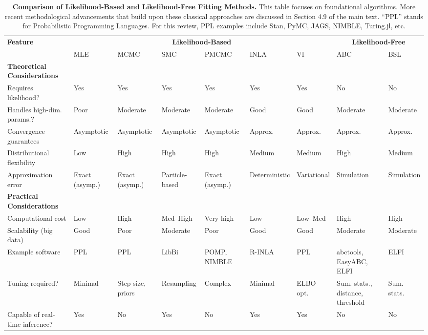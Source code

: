 \documentclass{article}
\begin{document}
\begin{landscape}
\begin{table}[ht]
\renewcommand{\arraystretch}{1.2}
\centering
\caption{\textbf{Comparison of Likelihood-Based and Likelihood-Free Fitting Methods.} 
This table focuses on foundational algorithms. More recent methodological advancements that build upon these classical approaches are discussed in Section 4.9 of the main text. ``PPL'' stands for Probabilistic Programming Languages. For this review, PPL examples include Stan, PyMC, JAGS, NIMBLE, Turing.jl, etc.}
\label{tab:methods_comparison}
\small
\begin{tabular}{@{}p{3.5cm}p{1.5cm}p{1.5cm}p{1.5cm}p{1.5cm}p{1.5cm}p{1.5cm}p{1.5cm}p{1.5cm}@{}}
\toprule
\multirow{2}{*}{\textbf{Feature}} & \multicolumn{6}{c}{\textbf{Likelihood-Based}} & \multicolumn{2}{c}{\textbf{Likelihood-Free}} \\
\cmidrule(lr){2-7} \cmidrule(lr){8-9}
 & MLE & MCMC & SMC & PMCMC & INLA & VI & ABC & BSL \\
\midrule
\textbf{Theoretical Considerations} & & & & & & & & \\
\midrule
Requires likelihood? & Yes & Yes & Yes & Yes & Yes & Yes & No & No \\
Handles high-dim. params.? & Poor & Moderate & Moderate & Moderate & Good & Good & Moderate & Moderate \\
Convergence guarantees & Asymptotic & Asymptotic & Asymptotic & Asymptotic & Approx. & Approx. & Approx. & Approx. \\
Distributional flexibility & Low & High & High & High & Medium & Medium & High & Medium \\
Approximation error & Exact (asymp.) & Exact (asymp.) & Particle-based & Exact (asymp.) & Deterministic & Variational & Simulation & Simulation \\
\midrule
\textbf{Practical Considerations} & & & & & & & & \\
\midrule
Computational cost & Low & High & Med--High & Very high & Low & Low--Med & High & High \\
Scalability (big data) & Good & Poor & Moderate & Poor & Good & Good & Moderate & Moderate \\
Example software & PPL & PPL & LibBi & POMP, NIMBLE & R-INLA & PPL & abctools, EasyABC, ELFI & ELFI \\
Tuning required? & Minimal & Step size, priors & Resampling & Complex & Minimal & ELBO opt. & Sum. stats., distance, threshold & Sum. stats. \\
Capable of real-time inference? & Yes & No & Yes & No & Yes & Yes & No & No \\

\end{tabular}
\end{table}
\end{landscape}
\end{document}
